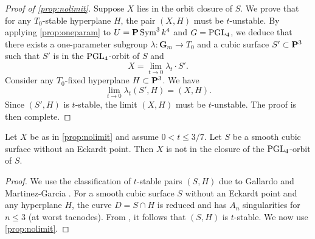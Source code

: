 \documentclass[12pt,reqno]{amsart}
\renewcommand{\k}{k}
\renewcommand{\to}{{\longrightarrow}}
\numberwithin{equation}{section}
\newcommand{\G}{\mathbf G}
\begin{document}
\begin{proof}[Proof of \autoref{prop:nolimit}]
  Suppose $X$ lies in the orbit closure of $S$.
  We prove that for any $T_0$-stable hyperplane $H$, the pair $(X, H)$ must be $t$-unstable.
  By applying \autoref{prop:oneparam} to $U = \P \Sym^3\k^4$ and $G = \PGL_4$, we deduce that there exists a one-parameter subgroup $\lambda \colon \G_m \to T_0$ and a cubic surface $S' \subset \P^3$ such that $S'$ is in the $\PGL_4$-orbit of $S$ and
  \[ X = \lim_{t \to 0} \lambda_t \cdot S'.\]
  Consider any $T_0$-fixed hyperplane $H \subset \P^3$.
  We have
  \[ \lim_{t \to 0} \lambda_t(S', H) = (X, H).\]
  Since $(S', H)$ is $t$-stable, the limit $(X, H)$ must be $t$-unstable.
  The proof is then complete.
\end{proof}
\begin{proposition}\label{cor:nolimit}
  Let $X$ be as in \autoref{prop:nolimit} and assume $0 < t \leq 3/7$.
  Let $S$ be a smooth cubic surface without an Eckardt point.
  Then $X$ is not in the closure of the $\PGL_4$-orbit of $S$.
\end{proposition}
\begin{proof}
  We use the classification of $t$-stable pairs $(S,H)$ due to Gallardo and Martinez-Garcia \cite{gal.mar:19}.
  For a smooth cubic surface $S$ without an Eckardt point and any hyperplane $H$, the curve $D = S \cap H$ is reduced and has $A_n$ singularities for $n \leq 3$ (at worst tacnodes).
  From \cite[Theorem~2]{gal.mar:19}, it follows that $(S, H)$ is $t$-stable.
  We now use \autoref{prop:nolimit}.
\end{proof}
\end{document}
